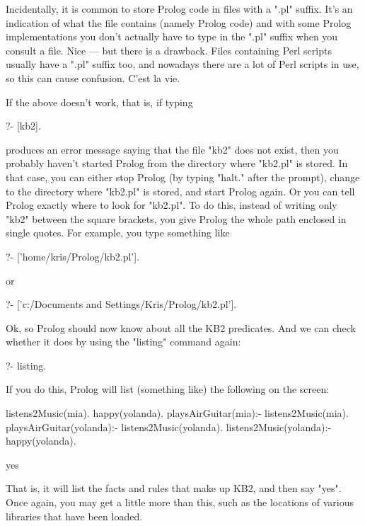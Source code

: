 Incidentally, it is common to store Prolog code in files with a
".pl" suffix. It's an indication of what the file contains (namely
Prolog code) and with some Prolog implementations you don't actually
have to type in the ".pl" suffix when you consult a file.  Nice ---
but there is a drawback. Files containing Perl scripts usually have a
".pl" suffix too, and nowadays there are a lot of Perl scripts in use,
so this can cause confusion. C'est la vie.

If the above doesn't work, that is, if typing
\begin{LPNcodedisplay}
?- [kb2].
\end{LPNcodedisplay}
produces an error message saying that the file "kb2"
does not exist, then you probably haven't started Prolog from the
directory where "kb2.pl" is stored. In that case, you can either stop
Prolog (by typing "halt." after the prompt), change to the directory
where "kb2.pl" is stored, and start Prolog again. Or you can tell
Prolog exactly where to look for "kb2.pl". To do this, instead of
writing only "kb2" between the square brackets, you give Prolog the
whole path enclosed in single quotes. For example, you type something
like
\begin{LPNcodedisplay}
?- ['home/kris/Prolog/kb2.pl'].
\end{LPNcodedisplay}

or
\begin{LPNcodedisplay}
?- ['c:/Documents and Settings/Kris/Prolog/kb2.pl'].
\end{LPNcodedisplay}


Ok, so Prolog should now know about all the KB2 predicates. And we can
check whether it does by using the "listing" command again:
%
\begin{LPNcodedisplay}
?- listing.
\end{LPNcodedisplay}
%
If you do this, Prolog will list (something like) the following on the
screen:
%
\begin{LPNcodedisplay}
listens2Music(mia).
happy(yolanda).
playsAirGuitar(mia):-
   listens2Music(mia).
playsAirGuitar(yolanda):-
   listens2Music(yolanda).
listens2Music(yolanda):-
   happy(yolanda).

yes
\end{LPNcodedisplay}
That is, it will list the facts and rules that make up KB2, and then
say "yes". Once again, you may get a little more than this, such as
the locations of various libraries that have been loaded.


